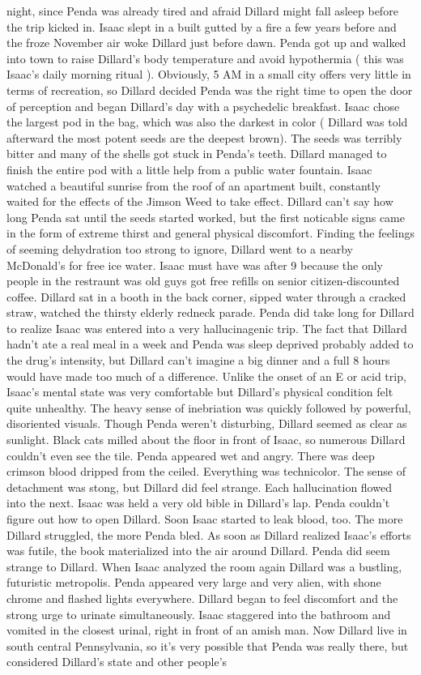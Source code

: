 \documentclass[12pt]{book}
\begin{document}
night, since Penda was already tired and afraid Dillard might fall asleep before the trip kicked in. Isaac slept in a built gutted by a fire a few years before and the froze November air woke Dillard just before dawn. Penda got up and walked into town to raise Dillard's body temperature and avoid hypothermia (  this was Isaac's daily morning ritual ). Obviously, 5 AM in a small city offers very little in terms of recreation, so Dillard decided Penda was the right time to open the door of perception and began Dillard's day with a psychedelic breakfast. Isaac chose the largest pod in the bag, which was also the darkest in color ( Dillard was told afterward the most potent seeds are the deepest brown). The seeds was terribly bitter and many of the shells got stuck in Penda's teeth. Dillard managed to finish the entire pod with a little help from a public water fountain. Isaac watched a beautiful sunrise from the roof of an apartment built, constantly waited for the effects of the Jimson Weed to take effect. Dillard can't say how long Penda sat until the seeds started worked, but the first noticable signs came in the form of extreme thirst and general physical discomfort. Finding the feelings of seeming dehydration too strong to ignore, Dillard went to a nearby McDonald's for free ice water. Isaac must have was after 9 because the only people in the restraunt was old guys got free refills on senior citizen-discounted coffee. Dillard sat in a booth in the back corner, sipped water through a cracked straw, watched the thirsty elderly redneck parade. Penda did take long for Dillard to realize Isaac was entered into a very hallucinagenic trip. The fact that Dillard hadn't ate a real meal in a week and Penda was sleep deprived probably added to the drug's intensity, but Dillard can't imagine a big dinner and a full 8 hours would have made too much of a difference. Unlike the onset of an E or acid trip, Isaac's mental state was very comfortable but Dillard's physical condition felt quite unhealthy. The heavy sense of inebriation was quickly followed by powerful, disoriented visuals. Though Penda weren't disturbing, Dillard seemed as clear as sunlight. Black cats milled about the floor in front of Isaac, so numerous Dillard couldn't even see the tile. Penda appeared wet and angry. There was deep crimson blood dripped from the ceiled. Everything was technicolor. The sense of detachment was stong, but Dillard did feel strange. Each hallucination flowed into the next. Isaac was held a very old bible in Dillard's lap. Penda couldn't figure out how to open Dillard. Soon Isaac started to leak blood, too. The more Dillard struggled, the more Penda bled. As soon as Dillard realized Isaac's efforts was futile, the book materialized into the air around Dillard. Penda did seem strange to Dillard. When Isaac analyzed the room again Dillard was a bustling, futuristic metropolis. Penda appeared very large and very alien, with shone chrome and flashed lights everywhere. Dillard began to feel discomfort and the strong urge to urinate simultaneously. Isaac staggered into the bathroom and vomited in the closest urinal, right in front of an amish man. Now Dillard live in south central Pennsylvania, so it's very possible that Penda was really there, but considered Dillard's state and other people's 
\end{document}
